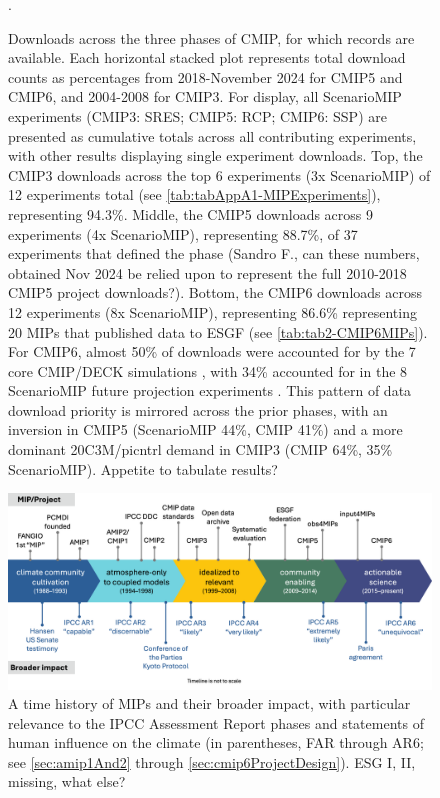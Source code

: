 \documentclass[gmd, preprint]{copernicus}
\def\cred#1{{\color{red}#1}}
\begin{document}
\begin{figure}
    \centering
    
    \caption{Downloads across the three phases of CMIP, for which records are available. Each horizontal stacked plot represents total download counts as percentages from 2018-November 2024 for CMIP5 and CMIP6, and 2004-2008 for CMIP3. For display, all ScenarioMIP experiments (CMIP3: SRES; CMIP5: RCP; CMIP6: SSP) are presented as cumulative totals across all contributing experiments, with other results displaying single experiment downloads. Top, the CMIP3 \citep{meehl_wcrp_2007} downloads across the top 6 experiments (3x ScenarioMIP) of 12 experiments total (see \autoref{tab:tabAppA1-MIPExperiments}), representing 94.3\%. Middle, the CMIP5 downloads across 9 experiments (4x ScenarioMIP), representing 88.7\%, of 37 experiments that defined the phase \citep[representing 8 MIPs identified in \autoref{tab:tabAppA1-MIPExperiments};][]{taylor_overview_2012} (\cred{Sandro F., can these numbers, obtained Nov 2024 be relied upon to represent the full 2010-2018 CMIP5 project downloads?}). Bottom, the CMIP6 downloads across 12 experiments (8x ScenarioMIP), representing 86.6\% representing 20 MIPs that published data to ESGF (see \autoref{tab:tab2-CMIP6MIPs}). For CMIP6, almost 50\% of downloads were accounted for by the 7 core CMIP/DECK simulations \citep{eyring_overview_2016}, with 34\% accounted for in the 8 ScenarioMIP future projection experiments \citep{oneill_scenario_2016}. This pattern of data download priority is mirrored across the prior phases, with an inversion in CMIP5 (ScenarioMIP 44\%, CMIP 41\%) and a more dominant 20C3M/picntrl demand in CMIP3 (CMIP 64\%, 35\% ScenarioMIP). \cred{Appetite to tabulate results?}}.
    \label{fig:fig5-MIPDownloads}
\end{figure}

\begin{figure}
    \centering
    \includegraphics[width=\textwidth]{241115_durack1-AMIP-CMIP-IPCC-Impact-trim-large.png}
    \caption{A time history of MIPs and their broader impact, with particular relevance to the IPCC Assessment Report phases and statements of human influence on the climate (in parentheses, FAR through AR6; see \autoref{sec:amip1And2} through \autoref{sec:cmip6ProjectDesign}). \cred{ESG I, II, missing, what else?}}
    \label{fig:fig6-MIPImpact}
\end{figure}
\end{document}
